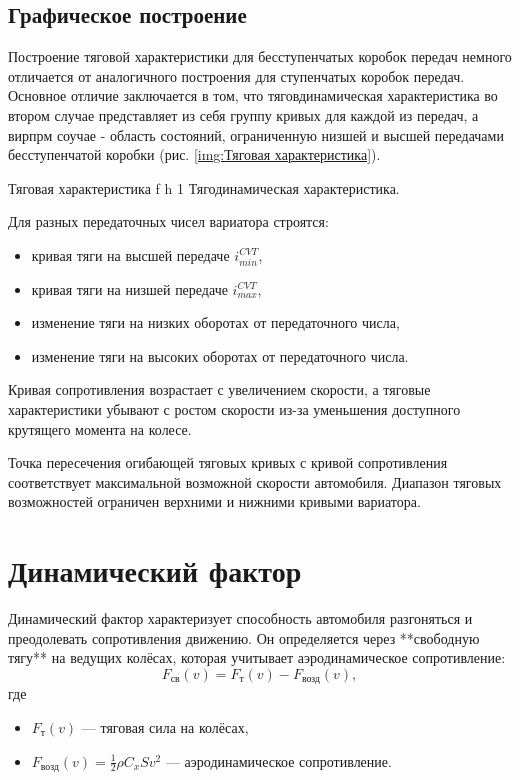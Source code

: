 \subsection*{Графическое построение}

Построение тяговой характеристики для бесступенчатых коробок передач немного отличается от аналогичного построения для ступенчатых коробок передач. Основное отличие заключается в том, что тяговдинамическая характеристика во втором случае представляет из себя группу кривых для каждой из передач, а вирпрм соучае - область состояний, ограниченную низшей и высшей передачами бесступенчатой коробки (рис. \ref{img:Тяговая характеристика}).

    {Тяговая характеристика} %
    {f} %
    {h} %
    {1\textwidth} %
    {Тягодинамическая характеристика.} %

Для разных передаточных чисел вариатора строятся:
\begin{itemize}
  \item кривая тяги на высшей передаче $i_{min}^{CVT}$,
  \item кривая тяги на низшей передаче $i_{max}^{CVT}$,
  \item изменение тяги на низких оборотах от передаточного числа,
  \item изменение тяги на высоких оборотах от передаточного числа.
\end{itemize}

Кривая сопротивления возрастает с увеличением скорости, а тяговые характеристики убывают с ростом скорости из-за уменьшения доступного крутящего момента на колесе.  

Точка пересечения огибающей тяговых кривых с кривой сопротивления соответствует максимальной возможной скорости автомобиля. Диапазон тяговых возможностей ограничен верхними и нижними кривыми вариатора.

\section{Динамический фактор}

Динамический фактор характеризует способность автомобиля разгоняться и преодолевать сопротивления движению. Он определяется через **свободную тягу** на ведущих колёсах, которая учитывает аэродинамическое сопротивление:
\[
F_{\text{св}}(v) = F_{\text{т}}(v) - F_{\text{возд}}(v),
\]
где
\begin{itemize}
    \item $F_{\text{т}}(v)$ — тяговая сила на колёсах,
    \item $F_{\text{возд}}(v) = \frac{1}{2}\rho C_x S v^2$ — аэродинамическое сопротивление.
\end{itemize}

